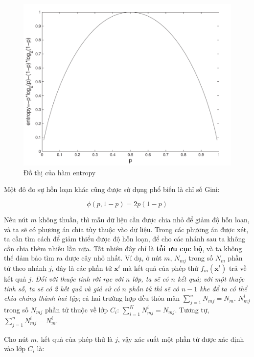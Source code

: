 \begin{figure}
    \centering
    \includegraphics[width=\linewidth]{figures/entropy_graph.png}
    \caption{Đồ thị của hàm entropy}
    \label{fig:entropy_graph}
\end{figure}


Một đô đo sự hỗn loạn khác cũng được sử dụng phổ biến là chỉ số Gini:

\begin{equation} \phi(p, 1 - p) = 2p(1-p) \end{equation}

Nếu nút $m$ không thuần, thì mẫu dữ liệu cần được chia nhỏ để giảm độ hỗn loạn, và ta sẽ có phương án chia tùy thuộc vào dữ liệu. Trong các phương án được xét, ta cần tìm cách để giảm thiểu được độ hỗn loạn, để cho các nhánh sau ta không cần chia thêm nhiều lần nữa. Tất nhiên đây chỉ là \textbf{tối ưu cục bộ}, và ta không thể đảm bảo tìm ra được cây nhỏ nhất.
Ví dụ, ở nút $m$, $N_{mj}$ trong số $N_m$ phần tử theo nhánh $j$, đây là các phần tử $\mathbf{x}^t$ mà kết quả của phép thử $f_m(\mathbf{x}^t)$ trả về kết quả $j$. \textit{Đối với thuộc tính rời rạc với $n$ lớp, ta sẽ có $n$ kết quả; với một thuộc tính số, ta sẽ có 2 kết quả và giả sử có $n$ phần tử thì sẽ có $n - 1$ khe để ta có thể chia chúng thành hai tập}; cả hai trường hợp đều thỏa mãn $\sum_{j=1}^{n} N_{mj} = N_m$. $N^i_{mj}$ trong số $N_{mj}$ phần tử thuộc về lớp $C_i$: $\sum_{i=1}^{K} N^{i}_{mj} = N_{mj}$. Tương tự, $\sum_{j=1}^{n} N^i_{mj} = N^i_m$.

Cho nút $m$, kết quả của phép thử là $j$, vậy xác suất một phần tử được xác định vào lớp $C_i$ là:

